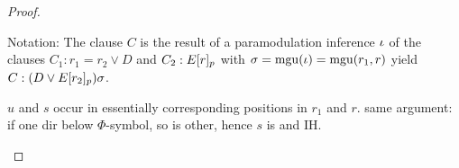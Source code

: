 \documentclass[,%
	draft=false,%
	numbers=noendperiod
	12pt,
	a4paper,
	oneside,%
	openany,
]{memoir}
\begin{document}
\begin{proof}
\begin{itemize}
\begin{itemize}
\begin{itemize}
								Notation:
								The clause $C$ is the result of a paramodulation inference\nolinebreak{} $\iota$ of
								the clauses $C_1: r_1=r_2 \lor D$ and $C_2: E{[r]_{p}}$ with $\sigma=\operatorname{mgu}(\iota)=\operatorname{mgu}(r_1, r)$ yield $C: (D\lor E{[r_2]_{p}})\sigma$.

								$u$ and $s$ occur in essentially corresponding positions in $r_1$ and $r$.
								same argument: if one dir below $\Phi$-symbol, so is other, hence $s$ is and IH.

					\end{itemize}
			\end{itemize}
			\cbend
	\end{itemize}




\end{proof}
\end{document}

